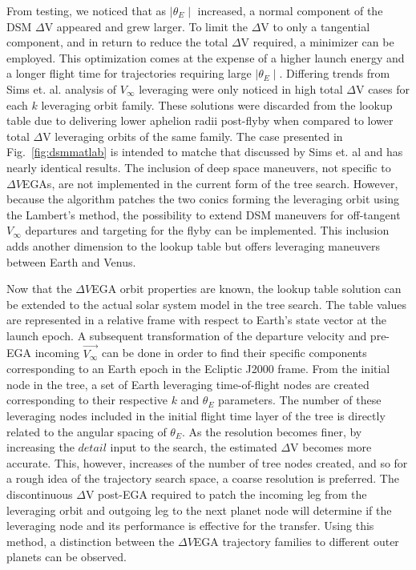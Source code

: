 \documentclass[letterpaper, preprint, paper,11pt]{AAS}	%
\begin{document}
From testing, we noticed that as $\mid\theta_E\mid$ increased, a normal component of the DSM $\Delta$V appeared and grew larger. To limit the $\Delta$V to only a tangential component, and in return to reduce the total $\Delta$V required, a minimizer can be employed. This optimization comes at the expense of a higher launch energy and a longer flight time for trajectories requiring large $\mid\theta_E\mid$. Differing trends from Sims et. al. analysis of $V_\infty$ leveraging\cite{sims1994} were only noticed in high total $\Delta$V cases for each $k$ leveraging orbit family. These solutions were discarded from the lookup table due to delivering lower aphelion radii post-flyby when compared to lower total $\Delta$V leveraging orbits of the same family. The case presented in Fig.~\ref{fig:dsmmatlab} is intended to matche that discussed by Sims et. al\cite{Sims1997} and has nearly identical results. The inclusion of deep space maneuvers, not specific to $\Delta V$EGAs, are not implemented in the current form of the tree search. However, because the algorithm patches the two conics forming the leveraging orbit using the Lambert's method, the possibility to extend DSM maneuvers for off-tangent $V_\infty$ departures and targeting for the flyby can be implemented. This inclusion adds another dimension to the lookup table but offers leveraging maneuvers between Earth and Venus.

Now that the $\Delta V$EGA orbit properties are known, the lookup table solution can be extended to the actual solar system model in the tree search. The table values are represented in a relative frame with respect to Earth's state vector at the launch epoch. A subsequent transformation of the departure velocity and pre-EGA incoming $\vec{V_\infty}$ can be done in order to find their specific components corresponding to an Earth epoch in the Ecliptic J2000 frame. From the initial node in the tree, a set of Earth leveraging time-of-flight nodes are created corresponding to their respective $k$ and $\theta_E$ parameters. The number of these leveraging nodes included in the initial flight time layer of the tree is directly related to the angular spacing of $\theta_E$. As the resolution becomes finer, by increasing the $\textit{detail}$ input to the search, the estimated $\Delta$V becomes more accurate. This, however, increases of the number of tree nodes created, and so for a rough idea of the trajectory search space, a coarse resolution is preferred. The discontinuous $\Delta$V post-EGA required to patch the incoming leg from the leveraging orbit and outgoing leg to the next planet node will determine if the leveraging node and its performance is effective for the transfer. Using this method, a distinction between the $\Delta V$EGA trajectory families to different outer planets can be observed.
\end{document}
